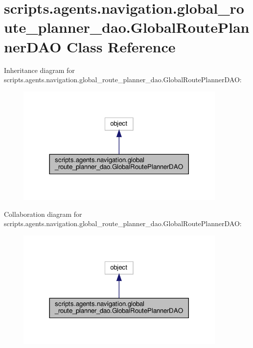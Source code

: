 \hypertarget{classscripts_1_1agents_1_1navigation_1_1global__route__planner__dao_1_1GlobalRoutePlannerDAO}{}\section{scripts.\+agents.\+navigation.\+global\+\_\+route\+\_\+planner\+\_\+dao.\+Global\+Route\+Planner\+D\+AO Class Reference}
\label{classscripts_1_1agents_1_1navigation_1_1global__route__planner__dao_1_1GlobalRoutePlannerDAO}


Inheritance diagram for scripts.\+agents.\+navigation.\+global\+\_\+route\+\_\+planner\+\_\+dao.\+Global\+Route\+Planner\+D\+AO\+:
\nopagebreak
\begin{figure}[H]
\begin{center}
\leavevmode
\includegraphics[width=293pt]{d1/dee/classscripts_1_1agents_1_1navigation_1_1global__route__planner__dao_1_1GlobalRoutePlannerDAO__inherit__graph}
\end{center}
\end{figure}


Collaboration diagram for scripts.\+agents.\+navigation.\+global\+\_\+route\+\_\+planner\+\_\+dao.\+Global\+Route\+Planner\+D\+AO\+:
\nopagebreak
\begin{figure}[H]
\begin{center}
\leavevmode
\includegraphics[width=293pt]{db/d72/classscripts_1_1agents_1_1navigation_1_1global__route__planner__dao_1_1GlobalRoutePlannerDAO__coll__graph}
\end{center}
\end{figure}
